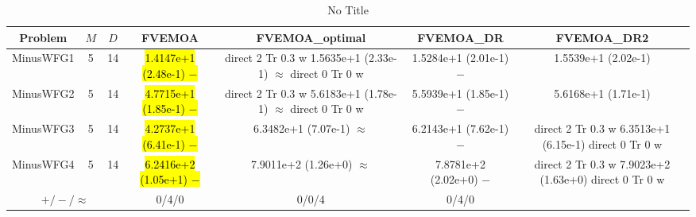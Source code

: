 \documentclass[journal]{IEEEtran}
\newcommand{\semitextbf}[1]{%
\pdfliteral direct {2 Tr 0.3 w} %
#1%
\pdfliteral direct {0 Tr 0 w}%
}
\begin{document}
\begin{table*}[htbp]
\renewcommand{\arraystretch}{1.2}
\centering
\caption{No Title}
\begin{tabular}{ccccccc}
\toprule
Problem&$M$&$D$&FVEMOA&FVEMOA\_optimal&FVEMOA\_DR&FVEMOA\_DR2\\
\midrule
\multirow{1}{*}{MinusWFG1}&5&14&\hl{1.4147e+1 (2.48e-1) $-$}&\semitextbf{1.5635e+1 (2.33e-1) $\approx$}&1.5284e+1 (2.01e-1) $-$&1.5539e+1 (2.02e-1)\\
\hline
\multirow{1}{*}{MinusWFG2}&5&14&\hl{4.7715e+1 (1.85e-1) $-$}&\semitextbf{5.6183e+1 (1.78e-1) $\approx$}&5.5939e+1 (1.85e-1) $-$&5.6168e+1 (1.71e-1)\\
\hline
\multirow{1}{*}{MinusWFG3}&5&14&\hl{4.2737e+1 (6.41e-1) $-$}&6.3482e+1 (7.07e-1) $\approx$&6.2143e+1 (7.62e-1) $-$&\semitextbf{6.3513e+1 (6.15e-1)}\\
\hline
\multirow{1}{*}{MinusWFG4}&5&14&\hl{6.2416e+2 (1.05e+1) $-$}&7.9011e+2 (1.26e+0) $\approx$&7.8781e+2 (2.02e+0) $-$&\semitextbf{7.9023e+2 (1.63e+0)}\\
\hline
\multicolumn{3}{c}{$+/-/\approx$}&0/4/0&0/0/4&0/4/0&\\
\bottomrule
\end{tabular}
\label{No Label}
\end{table*}
\end{document}
